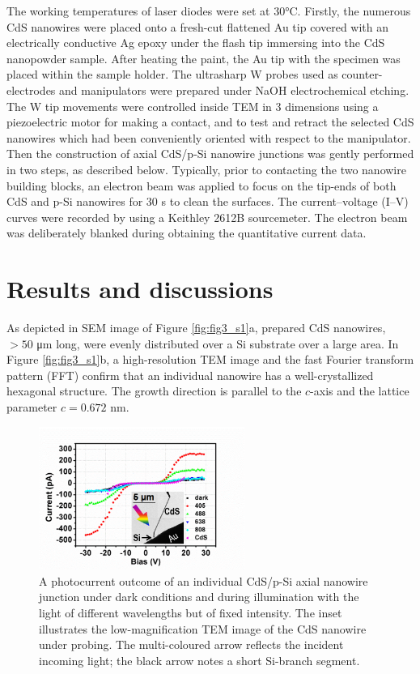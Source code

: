 The working temperatures of laser diodes were set at 30°C. Firstly, the numerous CdS nanowires were placed onto a fresh-cut flattened Au tip covered with an electrically conductive Ag epoxy under the flash tip immersing into the CdS nanopowder sample. After heating the paint, the Au tip with the specimen was placed within the sample holder. The ultrasharp W probes used as counter-electrodes and manipulators were prepared under NaOH electrochemical etching. The W tip movements were controlled inside TEM in 3 dimensions using a piezoelectric motor for making a contact, and to test and retract the selected CdS nanowires which had been conveniently oriented with respect to the manipulator. Then the construction of axial CdS/p-Si nanowire junctions was gently performed in two steps, as described below. Typically, prior to contacting the two nanowire building blocks, an electron beam was applied to focus on the tip-ends of both CdS and p-Si nanowires for 30 s to clean the surfaces. The current–voltage (I–V) curves were recorded by using a Keithley 2612B sourcemeter. The electron beam was deliberately blanked during obtaining the quantitative current data. 

\section{Results and discussions}
As depicted in SEM image of Figure \ref{fig:fig3_s1}a, prepared CdS nanowires, $>50$ μm long, were evenly distributed over a Si substrate over a large area. In Figure \ref{fig:fig3_s1}b, a high-resolution TEM image and the fast Fourier transform pattern (FFT) confirm that an individual nanowire has a well-crystallized hexagonal structure. The growth direction is parallel to the $c$-axis and the lattice parameter $c = 0.672$ nm. 

\begin{figure}  
\centering
\includegraphics[width=0.6\textwidth]{figures/figure3_3}
\caption[Photocurrent through junction.]{A photocurrent outcome of an individual CdS/p-Si axial nanowire junction under dark conditions and during illumination with the light of different wavelengths but of fixed intensity. The inset illustrates the low-magnification TEM image of the CdS nanowire under probing. The multi-coloured arrow reflects the incident incoming light; the black arrow notes a short Si-branch segment.
\label{fig:fig3_3}}
\end{figure}

